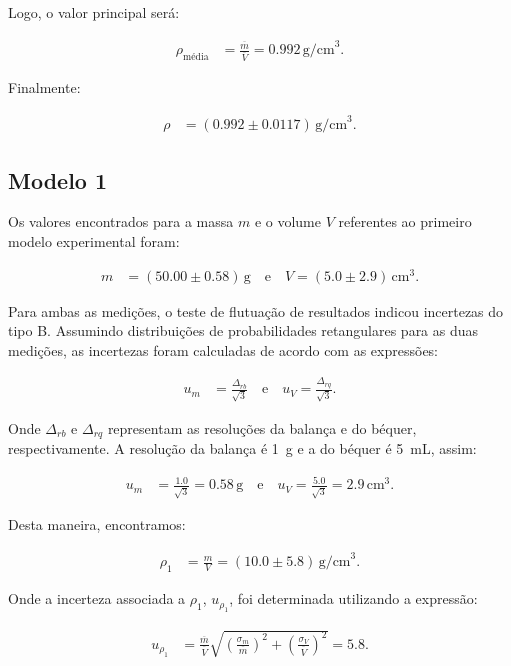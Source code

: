 \documentclass{article}
\begin{document}
\begin{multicols}{2}
Logo, o valor principal será:

\begin{align}
\rho_{\text{média}} &= \frac{\overline{m}}{\overline{V}} = 0.992 \, \text{g/cm}^3.
\end{align}

Finalmente:

\begin{align}
\rho &= (0.992 \pm 0.0117) \, \text{g/cm}^3.
\end{align}

\subsection{Modelo 1}
Os valores encontrados para a massa $m$ e o volume $V$ referentes ao primeiro modelo experimental foram:

\begin{align}
m &= (50.00 \pm 0.58) \, \text{g} \quad \text{e} \quad V = (5.0 \pm 2.9) \, \text{cm}^3.
\end{align}

Para ambas as medições, o teste de flutuação de resultados indicou incertezas do tipo B. Assumindo distribuições de probabilidades retangulares para as duas medições, as incertezas foram calculadas de acordo com as expressões:

\begin{align}
u_m &= \frac{\Delta_{rb}}{\sqrt{3}} \quad \text{e} \quad u_V = \frac{\Delta_{rq}}{\sqrt{3}}.
\end{align}

Onde $\Delta_{rb}$ e $\Delta_{rq}$ representam as resoluções da balança e do béquer, respectivamente. A resolução da balança é \SI{1}{\gram} e a do béquer é \SI{5}{\milli\liter}, assim:

\begin{align}
u_m &= \frac{1.0}{\sqrt{3}} = 0.58 \, \text{g} \quad \text{e} \quad u_V = \frac{5.0}{\sqrt{3}} = 2.9 \, \text{cm}^3.
\end{align}

Desta maneira, encontramos:

\begin{align}
\rho_1 &= \frac{m}{V} = (10.0 \pm 5.8) \, \text{g/cm}^3.
\end{align}

Onde a incerteza associada a $\rho_1$, $u_{\rho_1}$, foi determinada utilizando a expressão:

\begin{align}
u_{\rho_1} &= \frac{\overline{m}}{\overline{V}} \sqrt{\left(\frac{\sigma_m}{\overline{m}}\right)^2 + \left(\frac{\sigma_V}{\overline{V}}\right)^2} = 5.8.
\end{align}


\end{multicols}
\end{document}
